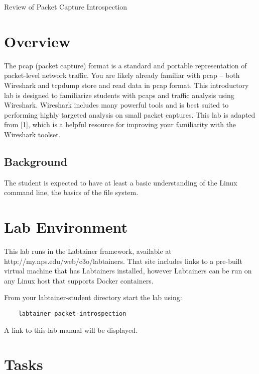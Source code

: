 


\begin{center}
{\LARGE Review of Packet Capture Introspection}
\vspace{0.1in}\\
\end{center}

\section{Overview}
The pcap (packet capture) format is a standard and portable representation of packet-level
network traffic. You are likely already familiar with pcap – both Wireshark and tcpdump
store and read data in pcap format.
This introductory lab is designed to familiarize students with pcaps and traffic analysis
using Wireshark. Wireshark includes many powerful tools and is best suited to performing
highly targeted analysis on small packet captures. This lab is adapted from [1], which is a
helpful resource for improving your familiarity with the Wireshark toolset.

\subsection {Background}
The student is expected to have at least a basic understanding of the Linux command line,
the basics of the file system.

\section{Lab Environment}
This lab runs in the Labtainer framework,
available at http://my.nps.edu/web/c3o/labtainers.
That site includes links to a pre-built virtual machine
that has Labtainers installed, however Labtainers can
be run on any Linux host that supports Docker containers.

From your labtainer-student directory start the lab using:
\begin{verbatim}
    labtainer packet-introspection
\end{verbatim}
\noindent A link to this lab manual will be displayed.  

\section {Tasks}

